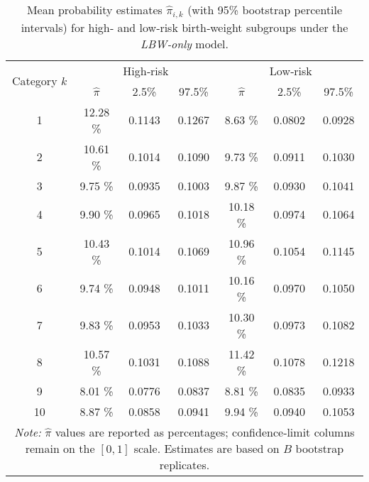 \begin{table}[H]
\centering
\caption{Mean probability estimates $\hat{\pi}_{i,k}$ (with 95\% bootstrap percentile intervals) for high‑ and low‑risk birth‑weight subgroups under the \emph{LBW‑only} model.}
\label{tab:pi_mean_lbw}
\begin{tabular}{ccccccc}
\toprule
\multirow{2}{*}{Category $k$} & \multicolumn{3}{c}{High‑risk} & \multicolumn{3}{c}{Low‑risk} \\
\cmidrule(lr){2-4}\cmidrule(lr){5-7}
 & $\hat{\pi}$ & 2.5\% & 97.5\% & $\hat{\pi}$ & 2.5\% & 97.5\% \\
\midrule
1  & 12.28 \% & 0.1143 & 0.1267 & 8.63 \% & 0.0802 & 0.0928 \\
2  & 10.61 \% & 0.1014 & 0.1090 & 9.73 \% & 0.0911 & 0.1030 \\
3  & 9.75 \% & 0.0935 & 0.1003 & 9.87 \% & 0.0930 & 0.1041 \\
4  & 9.90 \% & 0.0965 & 0.1018 & 10.18 \% & 0.0974 & 0.1064 \\
5  & 10.43 \% & 0.1014 & 0.1069 & 10.96 \% & 0.1054 & 0.1145 \\
6  & 9.74 \% & 0.0948 & 0.1011 & 10.16 \% & 0.0970 & 0.1050 \\
7  & 9.83 \% & 0.0953 & 0.1033 & 10.30 \% & 0.0973 & 0.1082 \\
8  & 10.57 \% & 0.1031 & 0.1088 & 11.42 \% & 0.1078 & 0.1218 \\
9  & 8.01 \% & 0.0776 & 0.0837 & 8.81 \% & 0.0835 & 0.0933 \\
10 & 8.87 \% & 0.0858 & 0.0941 & 9.94 \% & 0.0940 & 0.1053 \\
\bottomrule
\multicolumn{7}{p{0.9\textwidth}}{\textit{Note:} $\hat{\pi}$ values are reported as percentages; confidence‑limit columns remain on the \([0,1]\) scale.  Estimates are based on $B$ bootstrap replicates.}\\
\end{tabular}
\end{table}